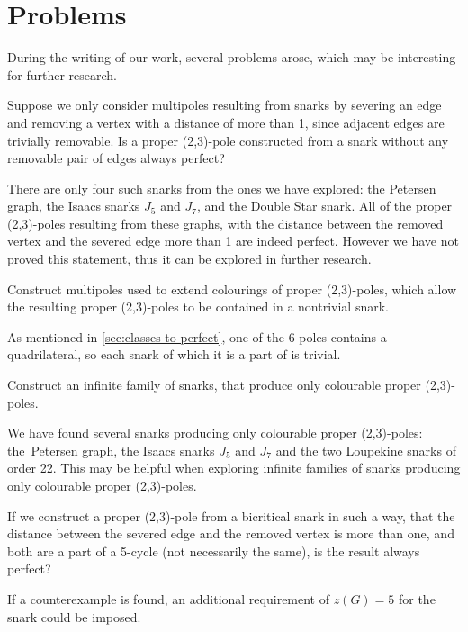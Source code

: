 \section{Problems}
\label{sec:problems}

During the writing of our work, several problems arose, which may be interesting for further research.

\begin{problem}
	Suppose we only consider multipoles resulting from snarks by severing an edge and removing a vertex with a distance of more than 1, since adjacent edges are trivially removable. Is a proper (2,3)-pole constructed from a snark without any removable pair of edges always perfect?
\end{problem}

There are only four such snarks from the ones we have explored: the Petersen graph, the Isaacs snarks $J_5$ and $J_7$, and the Double Star snark. All of the proper (2,3)-poles resulting from these graphs, with the distance between the removed vertex and the severed edge more than 1 are indeed perfect. However we have not proved this statement, thus it can be explored in further research.

\begin{problem}
	Construct multipoles used to extend colourings of proper (2,3)-poles, which allow the resulting proper (2,3)-poles to be contained in a nontrivial snark.
\end{problem}

As mentioned in \cref{sec:classes-to-perfect}, one of the 6-poles contains a quadrilateral, so each snark of which it is a part of is trivial.

\begin{problem}
	Construct an infinite family of snarks, that produce only colourable proper (2,3)-poles.
\end{problem}

We have found several snarks producing only colourable proper (2,3)-poles: the~Petersen graph, the Isaacs snarks $J_5$ and $J_7$ and the two Loupekine snarks of order 22. This may be helpful when exploring infinite families of snarks producing only colourable proper (2,3)-poles.

\begin{problem}
	If we construct a proper (2,3)-pole from a bicritical snark in such a way, that the distance between the severed edge and the removed vertex is more than one, and both are a part of a 5-cycle (not necessarily the same), is the result always perfect?
\end{problem}

If a counterexample is found, an additional requirement of $z(G)=5$ for the snark could be imposed.